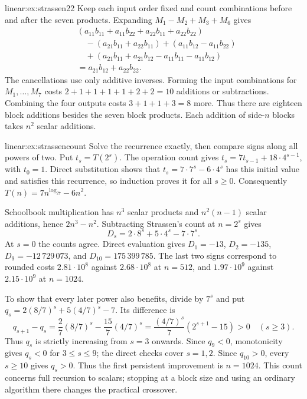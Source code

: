 \begin{solution}{linear:ex:strassen22}
\idea Keep each input order fixed and count combinations before and after the seven products.
\writeup Expanding $M_1-M_2+M_3+M_6$ gives
\[
\begin{aligned}
&(a_{11}b_{11}+a_{11}b_{22}+a_{22}b_{11}+a_{22}b_{22})\\
&\quad-(a_{21}b_{11}+a_{22}b_{11})+(a_{11}b_{12}-a_{11}b_{22})\\
&\quad+(a_{21}b_{11}+a_{21}b_{12}-a_{11}b_{11}-a_{11}b_{12})\\
&=a_{21}b_{12}+a_{22}b_{22}.
\end{aligned}
\]
The cancellations use only additive inverses. Forming the input combinations for $M_1,\ldots,M_7$ costs $2+1+1+1+1+2+2=10$ additions or subtractions. Combining the four outputs costs $3+1+1+3=8$ more. Thus there are eighteen block additions besides the seven block products. Each addition of side-$n$ blocks takes $n^2$ scalar additions.
\end{solution}

\begin{solution}{linear:ex:strassencount}
\idea Solve the recurrence exactly, then compare signs along all powers of two.
\writeup Put $t_s=T(2^s)$. The operation count gives $t_s=7t_{s-1}+18\cdot4^{s-1}$, with $t_0=1$. Direct substitution shows that $t_s=7\cdot7^s-6\cdot4^s$ has this initial value and satisfies this recurrence, so induction proves it for all $s\ge0$. Consequently $T(n)=7n^{\log_27}-6n^2$.

Schoolbook multiplication has $n^3$ scalar products and $n^2(n-1)$ scalar additions, hence $2n^3-n^2$. Subtracting Strassen's count at $n=2^s$ gives
\[
D_s=2\cdot8^s+5\cdot4^s-7\cdot7^s.
\]
At $s=0$ the counts agree. Direct evaluation gives $D_1=-13$, $D_2=-135$, $D_9=-12\,729\,073$, and $D_{10}=175\,399\,785$. The last two signs correspond to rounded costs $2.81\cdot10^8$ against $2.68\cdot10^8$ at $n=512$, and $1.97\cdot10^9$ against $2.15\cdot10^9$ at $n=1024$.

To show that every later power also benefits, divide by $7^s$ and put $q_s=2(8/7)^s+5(4/7)^s-7$. Its difference is
\[
q_{s+1}-q_s=\frac{2}{7}(8/7)^s-\frac{15}{7}(4/7)^s
 =\frac{(4/7)^s}{7}(2^{s+1}-15)>0\quad(s\ge3).
\]
Thus $q_s$ is strictly increasing from $s=3$ onwards. Since $q_9<0$, monotonicity gives $q_s<0$ for $3\le s\le9$; the direct checks cover $s=1,2$. Since $q_{10}>0$, every $s\ge10$ gives $q_s>0$. Thus the first persistent improvement is $n=1024$. This count concerns full recursion to scalars; stopping at a block size and using an ordinary algorithm there changes the practical crossover.
\end{solution}

